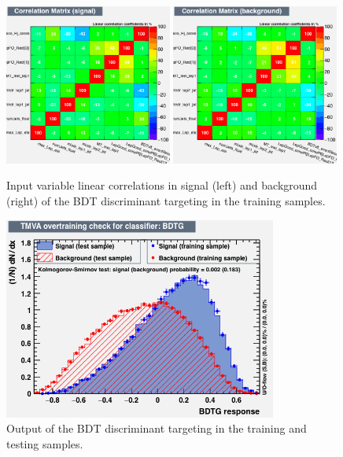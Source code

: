 \begin{figure}[hbtp]
 \begin{center}
   \includegraphics[width=0.49\textwidth]{ch9_figs/train_2lss_ttv_hj_value/CorrelationMatrixS.png}
   \includegraphics[width=0.49\textwidth]{ch9_figs/train_2lss_ttv_hj_value/CorrelationMatrixB.png}
   \caption[Input variable linear correlations of the BDT discriminant targeting \ttv]{Input variable linear correlations in signal (left) and background (right)
     of the BDT discriminant targeting \ttv in the training samples.}
   \label{fig:ttvBdt_corrMatrix}
 \end{center}
\end{figure}

\begin{figure}[hbtp]
 \begin{center}
   \includegraphics[width=0.8\textwidth]{ch9_figs/train_2lss_ttv_hj_value/overtrain_BDTG.png}
   \caption[Output of the BDT discriminant targeting \ttv]{Output of the BDT discriminant targeting \ttv in the training and testing samples.}
   \label{fig:ttvBdt_score}
 \end{center}
\end{figure}
